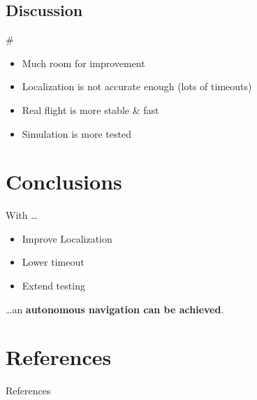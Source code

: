 \documentclass[]{beamer}
\def\mOrangeItem{\item[\textcolor{orange}{\textbullet}]}
\newcommand{\mSlideTitle}{{{\color{gray}\secname}} \# \subsecname}
\begin{document}
\subsection{Discussion}
\begin{frame}{\mSlideTitle}
  \begin{itemize}
    \mOrangeItem Much room for improvement
    \mOrangeItem Localization is not accurate enough (lots of timeouts)
    \mOrangeItem Real flight is more stable \& fast
    \mOrangeItem Simulation is more tested
  \end{itemize}
\end{frame}

\section{Conclusions}
\begin{frame}{\secname}
  With \dots
  \begin{itemize}
    \mOrangeItem Improve Localization
    \mOrangeItem Lower timeout
    \mOrangeItem Extend testing
  \end{itemize}
  \dots an \textbf{autonomous navigation can be achieved}.
\end{frame}

\section{References}
\begin{frame}[allowframebreaks]{References}
  \printbibliography%
\end{frame}
\end{document}
